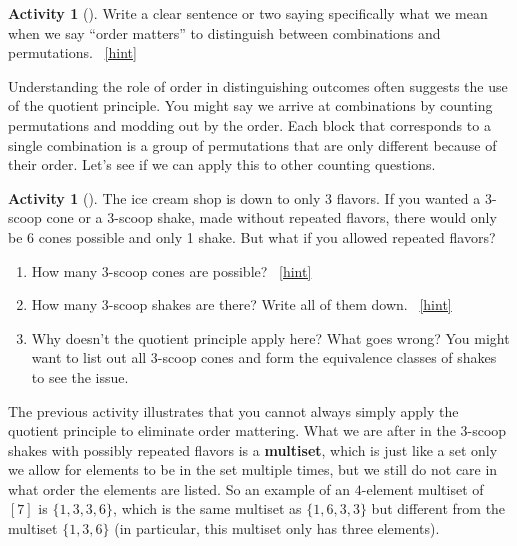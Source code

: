 \documentclass[10pt,]{book}
\newcommand{\terminology}[1]{\textbf{#1}}
\theoremstyle{plain}
\theoremstyle{definition}
\theoremstyle{definition}
\theoremstyle{definition}
\newtheorem{activity}[project]{Activity}
\numberwithin{equation}{chapter}
\begin{document}
\begin{activity}[]\label{activity-56}
\hypertarget{p-360}{}%
Write a clear sentence or two saying specifically what we mean when we say ``order matters'' to distinguish between combinations and permutations.%
~\hfill{\tiny\hyperlink{a-56}{[hint]}\hypertarget{q-56}{}}\end{activity}
\hypertarget{p-362}{}%
Understanding the role of order in distinguishing outcomes often suggests the use of the quotient principle.  You might say we arrive at combinations by counting permutations and modding out by the order.  Each block that corresponds to a single combination is a group of permutations that are only different because of their order.  Let's see if we can apply this to other counting questions.%
\begin{activity}[]\label{activity-57}
\hypertarget{p-363}{}%
The ice cream shop is down to only 3 flavors.  If you wanted a 3-scoop cone or a 3-scoop shake, made without repeated flavors, there would only be 6 cones possible and only 1 shake.  But what if you allowed repeated flavors?%
\begin{enumerate}[font=\bfseries,label=(\alph*),ref=\alph*]
\item\label{task-81} \hypertarget{p-364}{}%
How many 3-scoop cones are possible?%
~\hfill{\tiny\hyperlink{a-57.a}{[hint]}\hypertarget{q-57.a}{}}\item\label{task-82} \hypertarget{p-366}{}%
How many 3-scoop shakes are there?  Write all of them down.%
~\hfill{\tiny\hyperlink{a-57.b}{[hint]}\hypertarget{q-57.b}{}}\item\label{task-83} \hypertarget{p-368}{}%
Why doesn't the quotient principle apply here?  What goes wrong?  You might want to list out all 3-scoop cones and form the equivalence classes of shakes to see the issue.%
\end{enumerate}
\end{activity}
\hypertarget{p-369}{}%
The previous activity illustrates that you cannot always simply apply the quotient principle to eliminate order mattering.  What we are after in the 3-scoop shakes with possibly repeated flavors is a \terminology{multiset}, which is just like a set only we allow for elements to be in the set multiple times, but we still do not care in what order the elements are listed.  So an example of an \(4\)-element multiset of \([7]\) is \(\{1,3,3,6\}\), which is the same multiset as \(\{1,6,3,3\}\) but different from the multiset \(\{1,3,6\}\) (in particular, this multiset only has three elements).%
\par
\end{document}
